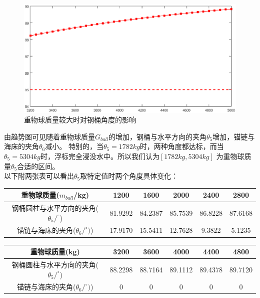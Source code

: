 \documentclass[a4paper,12pt]{ctexart}
\begin{document}
\begin{figure}[H]
\centering
\includegraphics[width=380pt]{question2_2.eps}
\caption{重物球质量较大时对钢桶角度的影响}
\end{figure}

 由趋势图可见随着重物球质量$G_{ball}$的增加，钢桶与水平方向的夹角$\theta_5$增加，锚链与海床的夹角$\theta_6$减小。
 特别的，当$\theta_5=1782kg$时，两种角度都达标，而当$\theta_5=5304kg$时，浮标完全浸没水中。所以我们认为$[1782kg,5304kg]$ 为重物球质量$\theta_5$合适的区间。\\

 以下附两张表可以看出$\theta_5$取特定值时两个角度具体变化：

\begin{center}
\begin{tabular}{cccccc}
\hline \hline
重物球质量($m_{ball}$/kg) & 1200  &  1600  &  2000  &  2400  &  2800 \\ \hline
钢桶圆柱与水平方向的夹角($\theta_5 /^{\circ}$)&81.9292 &  84.2387 &  85.7539  & 86.8228  & 87.6168 \\
锚链与海床的夹角($\theta_6/^{\circ})$)&17.9170  & 15.5411 &  12.7628 &   9.3822 &   5.1235\\
\hline \hline
\end{tabular}
\end{center}


\begin{center}
\begin{tabular}{cccccc}
\hline \hline
重物球质量(kg) & 3200  &  3600  &  4000  &  4400  &  4800 \\ \hline
钢桶圆柱与水平方向的夹角($\theta_5 /^{\circ}$)&88.2298 &  88.7164 &  89.1112 &  89.4378 &  89.7120 \\
锚链与海床的夹角($\theta_6/^{\circ})$)&0&0&0&0&0\\
\hline \hline
\end{tabular}
\end{center}
\end{document}
